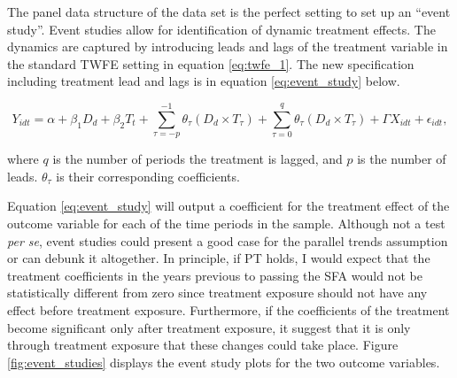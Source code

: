 \documentclass[titlepage]{article}
\theoremstyle{plain}
\theoremstyle{plain}
\begin{document}
The panel data structure of the data set is the perfect setting to set up an \enquote{event study}. Event studies allow for identification of dynamic treatment effects. The dynamics are captured by introducing leads and lags of the treatment variable in the standard TWFE setting in equation \ref{eq:twfe_1}. The new specification including treatment lead and lags is in equation \ref{eq:event_study} below.

\begin{equation}
	\label{eq:event_study}
	Y_{idt} = \alpha + \beta_{1}\textit{D}_{d} + \beta_{2}\textit{T}_{t} + \sum_{\tau = -p}^{-1}\theta_{\tau}(\textit{D}_{d} \times \textit{T}_{\tau}) + \sum_{\tau = 0}^{q}\theta_{\tau}(\textit{D}_{d} \times \textit{T}_{\tau})+ \Gamma X_{idt} + \epsilon_{idt},
\end{equation}

\noindent where $q$ is the number of periods the treatment is lagged, and $p$ is the number of leads. $\theta_{\tau}$ is their corresponding coefficients.

Equation \ref{eq:event_study} will output a coefficient for the treatment effect of the outcome variable for each of the time periods in the sample. Although not a test \textit{per se}, event studies could present a good case for the parallel trends assumption or can debunk it altogether. In principle, if PT holds, I would expect that the treatment coefficients in the years previous to passing the SFA would not be statistically different from zero since treatment exposure should not have any effect before treatment exposure. Furthermore, if the coefficients of the treatment become significant only after treatment exposure, it suggest that it is only through treatment exposure that these changes could take place. Figure \ref{fig:event_studies} displays the event study plots for the two outcome variables.
\end{document}

